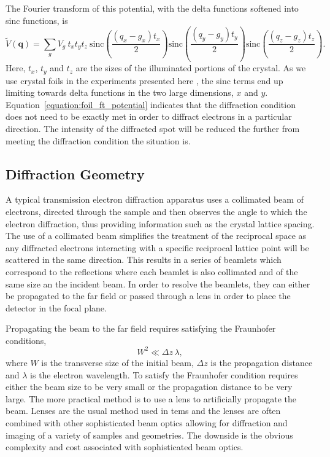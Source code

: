 The Fourier transform of this potential, with the delta functions softened into sinc functions, is
\begin{equation}\label{equation:foil_ft_potential}
\tilde{V}(\mathbf{q}) = \sum_g V_g \: t_x  t_y  t_z \: \text{sinc}{\left( \frac{(q_x-g_x)t_x}{2} \right)} \text{sinc}{\left( \frac{(q_y-g_y)t_y}{2} \right)} \text{sinc}{\left( \frac{(q_z-g_z)t_z}{2} \right)}.
\end{equation}
Here, $t_x$, $t_y$ and $t_z$ are the sizes of the illuminated portions of the crystal.
As we use crystal foils in the experiments presented here , the sinc terms end up limiting towards delta functions in the two large dimensions, $x$ and $y$.
Equation~\ref{equation:foil_ft_potential} indicates that the diffraction condition does not need to be exactly met in order to diffract electrons in a particular direction.
The intensity of the diffracted spot will be reduced the further from meeting the diffraction condition the situation is.

\subsection{Diffraction Geometry}

A typical transmission electron diffraction apparatus uses a collimated beam of electrons, directed through the sample and then observes the angle to which the electron diffraction, thus providing information such as the crystal lattice spacing.
The use of a collimated beam simplifies the treatment of the reciprocal space as any diffracted electrons interacting with a specific reciprocal lattice point will be scattered in the same direction.
This results in a series of beamlets which correspond to the reflections where each beamlet is also collimated and of the same size an the incident beam.
In order to resolve the beamlets, they can either be propagated to the far field or passed through a lens in order to place the detector in the focal plane.

Propagating the beam to the far field requires satisfying the Fraunhofer conditions,
\begin{equation}
W^2 \ll \Delta z\,\lambda,
\end{equation}
where $W$ is the transverse size of the initial beam, $\Delta z$ is the propagation distance and $\lambda$ is the electron wavelength.
To satisfy the Fraunhofer condition requires either the beam size to be very small or the propagation distance to be very large.
The more practical method is to use a lens to artificially propagate the beam.
Lenses are the usual method used in \glspl{tem} and the lenses are often combined with other sophisticated beam optics allowing for diffraction and imaging of a variety of samples and geometries.
The downside is the obvious complexity and cost associated with sophisticated beam optics.

